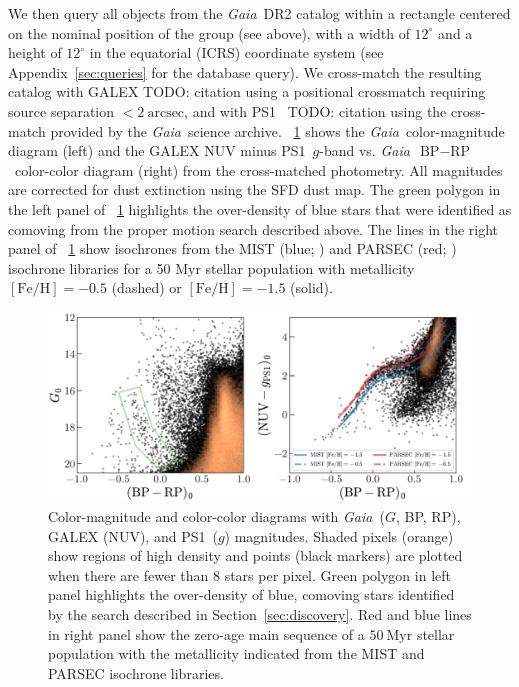 \documentclass[modern]{aastex62}
\newcommand{\acronym}[1]{{\small{#1}}}
\newcommand{\gaia}{\textsl{Gaia}}
\newcommand{\pans}{\acronym{PS1}}
\newcommand{\DR}[1]{\acronym{DR#1}}
\newcommand{\todo}[1]{{\color{red} TODO: #1}}
\newcommand{\sectionname}{Section}
\newcommand{\feh}{\ensuremath{[\textrm{Fe} / \textrm{H}]}}
\newcommand{\bprp}{\ensuremath{\textrm{BP} - \textrm{RP}}}
\begin{document}
We then query all objects from the \gaia\ \DR{2} catalog within a rectangle centered on the nominal position of the group (see above), with a width of $12^\circ$ and a height of $12^\circ$ in the equatorial (ICRS) coordinate system (see Appendix~\ref{sec:queries} for the database query).
We cross-match the resulting catalog with \acronym{GALEX} \todo{citation} using a positional crossmatch requiring source separation $<2~\textrm{arcsec}$, and with \pans\ \todo{citation}\citep{Chambers:XX} using the cross-match provided by the \gaia\ science archive.
\figurename~\ref{fig:cmds} shows the \gaia\ color-magnitude diagram (left) and the \acronym{GALEX} NUV minus \pans\ $g$-band vs. \gaia\ \bprp\ color-color diagram (right) from the cross-matched photometry.
All magnitudes are corrected for dust extinction using the SFD \citep{Schlegel:1998} dust map.
The green polygon in the left panel of \figurename~\ref{fig:cmds} highlights the over-density of blue stars that were identified as comoving from the proper motion search described above.
The lines in the right panel of \figurename~\ref{fig:cmds} show isochrones from the \acronym{MIST} (blue; \citealt{TODO}) and \acronym{PARSEC} (red; \citealt{TODO}) isochrone libraries for a 50 Myr stellar population with metallicity $\feh = -0.5$ (dashed) or $\feh = -1.5$ (solid).

\begin{figure}
\centering
\includegraphics[width=\textwidth]{figures/gaia-galex-cmd.pdf}
\caption{Color-magnitude and color-color diagrams with \gaia\ ($G$, BP, RP), \acronym{GALEX} (NUV), and \pans\ ($g$) magnitudes.
Shaded pixels (orange) show regions of high density and points (black markers) are plotted when there are fewer than 8 stars per pixel.
Green polygon in left panel highlights the over-density of blue, comoving stars identified by the search described in \sectionname~\ref{sec:discovery}.
Red and blue lines in right panel show the zero-age main sequence of a $50~\textrm{Myr}$ stellar population with the metallicity indicated from the \acronym{MIST} \citep{TODO} and \acronym{PARSEC} \citep{TODO} isochrone libraries.
}
\label{fig:cmds}
\end{figure}
\end{document}
